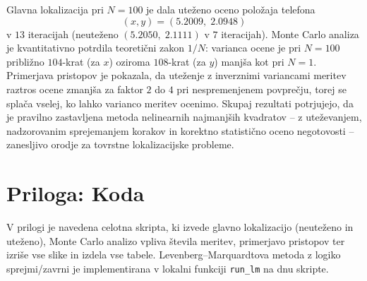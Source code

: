 \documentclass[a4paper,11pt]{article}
\begin{document}
Glavna lokalizacija pri $N=100$ je dala uteženo oceno položaja telefona
\[
(x,y) = (5.2009,\; 2.0948)
\]
v $13$ iteracijah (neuteženo $(5.2050,\;2.1111)$ v $7$ iteracijah). Monte Carlo analiza je kvantitativno potrdila teoretični zakon $1/N$: varianca ocene je pri $N=100$ približno $104$-krat (za $x$) oziroma $108$-krat (za $y$) manjša kot pri $N=1$. Primerjava pristopov je pokazala, da uteženje z inverznimi variancami meritev raztros ocene zmanjša za faktor $2$ do $4$ pri nespremenjenem povprečju, torej se splača vselej, ko lahko varianco meritev ocenimo. Skupaj rezultati potrjujejo, da je pravilno zastavljena metoda nelinearnih najmanjših kvadratov -- z uteževanjem, nadzorovanim sprejemanjem korakov in korektno statistično oceno negotovosti -- zanesljivo orodje za tovrstne lokalizacijske probleme.

\newpage
\section*{Priloga: Koda}
V prilogi je navedena celotna skripta, ki izvede glavno lokalizacijo (neuteženo in uteženo), Monte Carlo analizo vpliva števila meritev, primerjavo pristopov ter izriše vse slike in izdela vse tabele. Levenberg--Marquardtova metoda z logiko sprejmi/zavrni je implementirana v lokalni funkciji \texttt{run\_lm} na dnu skripte.


\end{document}
